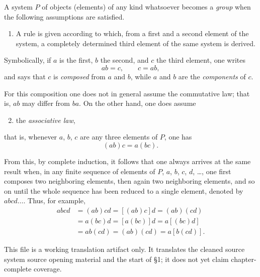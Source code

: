 \documentclass[12pt,a4paper]{book}
\begin{document}
A system $P$ of objects (elements) of any kind whatsoever becomes a \emph{group} when the following assumptions are satisfied.

\begin{enumerate}
\item A rule is given according to which, from a first and a second element of the system, a completely determined third element of the same system is derived.
\end{enumerate}

Symbolically, if $a$ is the first, $b$ the second, and $c$ the third element, one writes
\[
ab=c,\qquad c=ab,
\]
and says that $c$ is \emph{composed} from $a$ and $b$, while $a$ and $b$ are the \emph{components} of $c$.

For this composition one does not in general assume the commutative law; that is, $ab$ may differ from $ba$. On the other hand, one does assume

\begin{enumerate}
\setcounter{enumi}{1}
\item the \emph{associative law},
\end{enumerate}
that is, whenever $a$, $b$, $c$ are any three elements of $P$, one has
\[
(ab)c=a(bc).
\]

From this, by complete induction, it follows that one always arrives at the same result when, in any finite sequence of elements of $P$, $a$, $b$, $c$, $d$, \dots, one first composes two neighboring elements, then again two neighboring elements, and so on until the whole sequence has been reduced to a single element, denoted by $abcd\dots$. Thus, for example,
\begin{align*}
abcd &= (ab)cd = [(ab)c]d = (ab)(cd) \\
     &= a(bc)d = [a(bc)]d = a[(bc)d] \\
     &= ab(cd) = (ab)(cd) = a[b(cd)].
\end{align*}

\bigskip
\noindent This file is a working translation artifact only. It translates the cleaned source system source opening material and the start of \S 1; it does not yet claim chapter-complete coverage.
\end{document}
